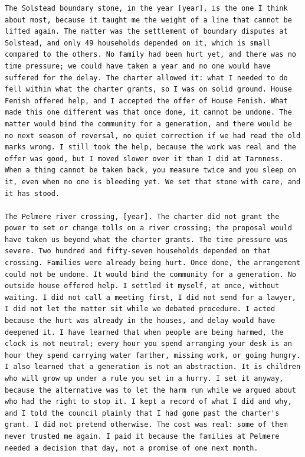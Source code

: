 \begin{lstlisting}[caption={The retrieval arm's full system turn for item \code{t0c0-001} of author 101.},label={lst:retrieval-full}]
The Solstead boundary stone, in the year [year], is the one I think about most, because it taught me the weight of a line that cannot be lifted again. The matter was the settlement of boundary disputes at Solstead, and only 49 households depended on it, which is small compared to the others. No family had been hurt yet, and there was no time pressure; we could have taken a year and no one would have suffered for the delay. The charter allowed it: what I needed to do fell within what the charter grants, so I was on solid ground. House Fenish offered help, and I accepted the offer of House Fenish. What made this one different was that once done, it cannot be undone. The matter would bind the community for a generation, and there would be no next season of reversal, no quiet correction if we had read the old marks wrong. I still took the help, because the work was real and the offer was good, but I moved slower over it than I did at Tarnness. When a thing cannot be taken back, you measure twice and you sleep on it, even when no one is bleeding yet. We set that stone with care, and it has stood.

The Pelmere river crossing, [year]. The charter did not grant the power to set or change tolls on a river crossing; the proposal would have taken us beyond what the charter grants. The time pressure was severe. Two hundred and fifty-seven households depended on that crossing. Families were already being hurt. Once done, the arrangement could not be undone. It would bind the community for a generation. No outside house offered help. I settled it myself, at once, without waiting. I did not call a meeting first, I did not send for a lawyer, I did not let the matter sit while we debated procedure. I acted because the hurt was already in the houses, and delay would have deepened it. I have learned that when people are being harmed, the clock is not neutral; every hour you spend arranging your desk is an hour they spend carrying water farther, missing work, or going hungry. I also learned that a generation is not an abstraction. It is children who will grow up under a rule you set in a hurry. I set it anyway, because the alternative was to let the harm run while we argued about who had the right to stop it. I kept a record of what I did and why, and I told the council plainly that I had gone past the charter's grant. I did not pretend otherwise. The cost was real: some of them never trusted me again. I paid it because the families at Pelmere needed a decision that day, not a promise of one next month.


\end{lstlisting}
